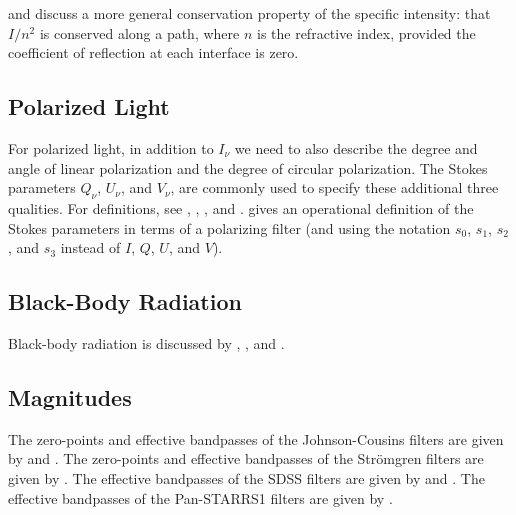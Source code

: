 \citet[pp.\ 74--75]{Milne-1930} and \citet[p.\ 4]{Mihalas-1978} discuss
a more general conservation property of the specific intensity: that
$I/n^2$ is conserved along a path, where $n$ is the refractive index,
provided the coefficient of reflection at each interface is zero.


\subsection{Polarized Light}

For polarized light, in addition to $I_\nu$ we need to also describe the
degree and angle of linear polarization and the degree of circular
polarization. The Stokes parameters $Q_\nu$, $U_\nu$, and $V_\nu$, are
commonly used to specify these additional three qualities. For
definitions, see \citet[pp.\ 24--35]{Chandrasekhar-1960},
\citet[pp.\ 62--69]{Rybicki-1979}, \citet[ch.\ 12]{Shu-1991}, and
\citet[pp.\ 135--137]{Rutten}. \citet[pp.\ 366--367]{Hecht-1998} gives
an operational definition of the Stokes parameters in terms of a
polarizing filter (and using the notation $s_0$, $s_1$, $s_2$, and $s_3$
instead of $I$, $Q$, $U$, and $V$).

\subsection{Black-Body Radiation}

Black-body radiation is discussed by \citet[pp.\ 15--27]{Rybicki-1979},
\citet[pp.\ 6--7]{Mihalas-1978}, and \citet[ch.\ 6]{Gray-1992}.

\subsection{Magnitudes}

The zero-points and effective bandpasses of the Johnson-Cousins filters are given by \citet{Bessell-1988} and \citet{Bessell-2012}. The zero-points and effective bandpasses of the Strömgren filters are given by \citet{Bessell-2011}. The effective bandpasses of the SDSS filters are given by \citet{Fukugita-1996} and \citet{Doi-2010}. The effective bandpasses of the Pan-STARRS1 filters are given by \citet{Tonry-2012}.

